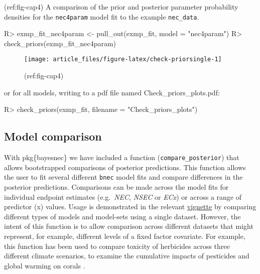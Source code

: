 \documentclass[
]{jss}
\begin{document}
(ref:fig-cap4) A comparison of the prior and posterior parameter
probability densities for the \texttt{nec4param} model fit to the
example \texttt{nec\_data}.

\begin{CodeChunk}
\begin{CodeInput}
R> exmp_fit_nec4param <- pull_out(exmp_fit, model = "nec4param")
R> check_priors(exmp_fit_nec4param)
\end{CodeInput}
\begin{figure}

{\centering \texttt{[image: article\_files/figure-latex/check-priorsingle-1]} 

}

\caption[(ref:fig-cap4)]{(ref:fig-cap4)}\label{fig:check-priorsingle}
\end{figure}
\end{CodeChunk}

or for all models, writing to a pdf file named Check\_priors\_plots.pdf:

\begin{CodeChunk}
\begin{CodeInput}
R> check_priors(exmp_fit, filename = "Check_priors_plots")
\end{CodeInput}
\end{CodeChunk}

\hypertarget{model-comparison}{%
\subsection{Model comparison}\label{model-comparison}}

With pkg\{bayesnec\} we have included a function
(\texttt{compare\_posterior}) that allows bootstrapped comparisons of
posterior predictions. This function allows the user to fit several
different \texttt{bnec} model fits and compare differences in the
posterior predictions. Comparisons can be made across the model fits for
individual endpoint estimates (e.g.~\emph{NEC}, \emph{NSEC} or
\emph{ECx}) or across a range of predictor (x) values. Usage is
demonstrated in the relevant
\href{https://open-aims.github.io/bayesnec/articles/example4.html}{vignette}
by comparing different types of models and model-sets using a single
dataset. However, the intent of this function is to allow comparison
across different datasets that might represent, for example, different
levels of a fixed factor covariate. For example, this function has been
used to compare toxicity of herbicides across three different climate
scenarios, to examine the cumulative impacts of pesticides and global
warming on corals \citep{flores2021}.
\end{document}
